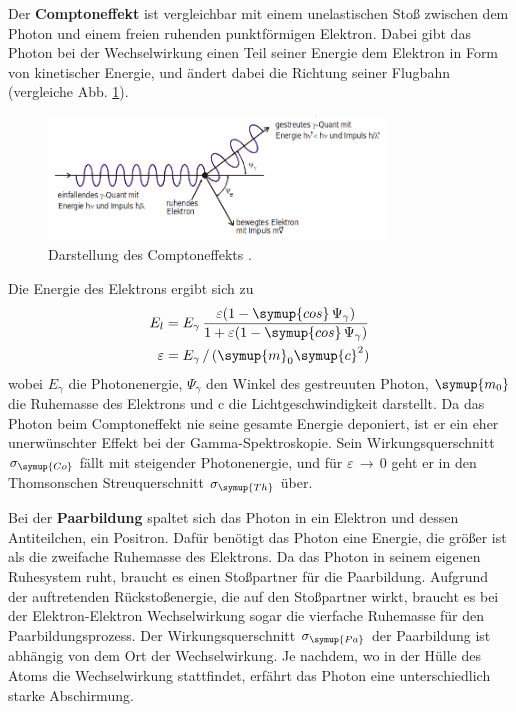     Der \textbf{Comptoneffekt} ist vergleichbar mit einem unelastischen Stoß zwischen
    dem Photon und einem freien ruhenden punktförmigen Elektron. Dabei gibt das Photon
    bei der Wechselwirkung einen Teil seiner Energie dem Elektron in Form von kinetischer Energie, und
    ändert dabei die Richtung seiner Flugbahn (vergleiche Abb. \ref{fig:compton_skizze}).
    \begin{figure}
      \centering
      \includegraphics[width=0.8\textwidth]{compton_skizze.png}
      \caption{Darstellung des Comptoneffekts \cite{anleitungv18}.}
      \label{fig:compton_skizze}
    \end{figure}
    Die Energie des Elektrons ergibt sich zu
    \begin{align}
      E_l &= E_\gamma \,\frac{\varepsilon(1-\symup{cos}\,\Psi_\gamma)}{1+\varepsilon(1-\symup{cos}\,\Psi_\gamma)}\\
      \varepsilon &= E_\gamma\,/\,(\symup{m}_0 \symup{c}^2)
    \end{align}
    wobei $E_\gamma$ die Photonenergie, $\Psi_\gamma$ den Winkel des gestreuuten Photon,
    $\symup{m_0}$ die Ruhemasse des Elektrons und c die Lichtgeschwindigkeit darstellt.
    Da das Photon beim Comptoneffekt nie seine gesamte Energie deponiert, ist er ein
    eher unerwünschter Effekt bei der Gamma-Spektroskopie. Sein Wirkungsquerschnitt $\sigma_{\symup{Co}}$
    fällt mit steigender Photonenergie, und für $\varepsilon\, \to \, 0$ geht er in den
    Thomsonschen Streuquerschnitt $\sigma_{\symup{Th}}$ über.

    Bei der \textbf{Paarbildung} spaltet sich das Photon in ein Elektron und dessen Antiteilchen, ein Positron.
    Dafür benötigt das Photon eine Energie, die größer ist als die zweifache Ruhemasse des Elektrons.
    Da das Photon in seinem eigenen Ruhesystem ruht, braucht es einen Stoßpartner für die Paarbildung.
    Aufgrund der auftretenden Rückstoßenergie, die auf den Stoßpartner wirkt, braucht es bei der
    Elektron-Elektron Wechselwirkung sogar die vierfache Ruhemasse für den Paarbildungsprozess.
    Der Wirkungsquerschnitt $\sigma_{\symup{Pa}}$ der Paarbildung ist abhängig von dem Ort der Wechselwirkung.
    Je nachdem, wo in der Hülle des Atoms die Wechselwirkung stattfindet, erfährt das Photon eine unterschiedlich
    starke Abschirmung.

